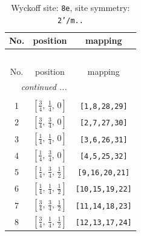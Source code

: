 \documentclass[fleqn,8pt]{jsarticle}
\begin{document}
\renewcommand{\arraystretch}{1.2}
\begin{longtable}{ccc}
\caption{Wyckoff site: {\tt 8e}, site symmetry: {\tt 2'/m..}}
 \\
 \hline \hline
No. & position & mapping \\ \hline \endfirsthead

\multicolumn{2}{l}{\tablename\ \thetable{}} \\
 \hline \hline
No. & position & mapping \\ \hline \endhead

 \hline \hline
\multicolumn{2}{r}{\footnotesize\it continued ...} \\ \endfoot

 \hline \hline
\multicolumn{2}{r}{} \\ \endlastfoot

1 & $\left[ \frac{3}{4},\, \frac{1}{4},\, 0 \right]$ & {\tt [1,8,28,29]} \\ \hline
2 & $\left[ \frac{3}{4},\, \frac{3}{4},\, 0 \right]$ & {\tt [2,7,27,30]} \\ \hline
3 & $\left[ \frac{1}{4},\, \frac{1}{4},\, 0 \right]$ & {\tt [3,6,26,31]} \\ \hline
4 & $\left[ \frac{1}{4},\, \frac{3}{4},\, 0 \right]$ & {\tt [4,5,25,32]} \\ \hline
5 & $\left[ \frac{1}{4},\, \frac{3}{4},\, \frac{1}{2} \right]$ & {\tt [9,16,20,21]} \\ \hline
6 & $\left[ \frac{1}{4},\, \frac{1}{4},\, \frac{1}{2} \right]$ & {\tt [10,15,19,22]} \\ \hline
7 & $\left[ \frac{3}{4},\, \frac{3}{4},\, \frac{1}{2} \right]$ & {\tt [11,14,18,23]} \\ \hline
8 & $\left[ \frac{3}{4},\, \frac{1}{4},\, \frac{1}{2} \right]$ & {\tt [12,13,17,24]} \\
\end{longtable}
\renewcommand{\arraystretch}{1.2}
\end{document}
